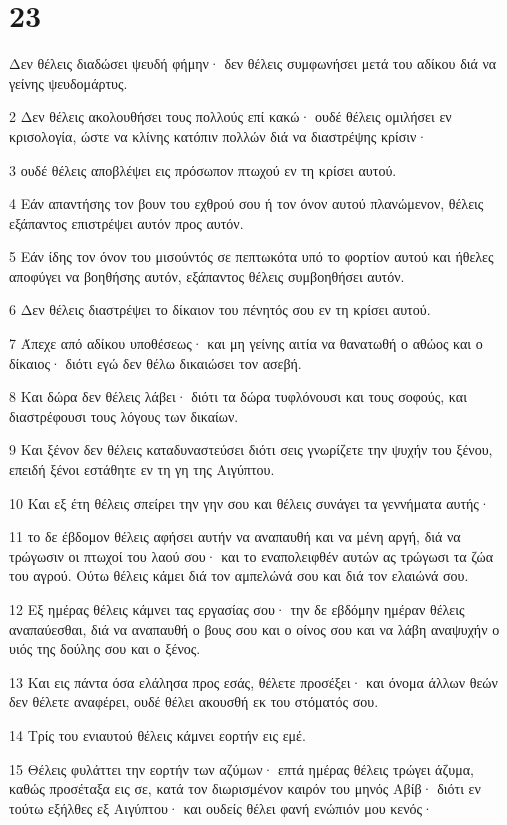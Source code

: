 \chapter{23}

\par Δεν θέλεις διαδώσει ψευδή φήμην· δεν θέλεις συμφωνήσει μετά του αδίκου διά να γείνης ψευδομάρτυς.
\par 2 Δεν θέλεις ακολουθήσει τους πολλούς επί κακώ· ουδέ θέλεις ομιλήσει εν κρισολογία, ώστε να κλίνης κατόπιν πολλών διά να διαστρέψης κρίσιν·
\par 3 ουδέ θέλεις αποβλέψει εις πρόσωπον πτωχού εν τη κρίσει αυτού.
\par 4 Εάν απαντήσης τον βουν του εχθρού σου ή τον όνον αυτού πλανώμενον, θέλεις εξάπαντος επιστρέψει αυτόν προς αυτόν.
\par 5 Εάν ίδης τον όνον του μισούντός σε πεπτωκότα υπό το φορτίον αυτού και ήθελες αποφύγει να βοηθήσης αυτόν, εξάπαντος θέλεις συμβοηθήσει αυτόν.
\par 6 Δεν θέλεις διαστρέψει το δίκαιον του πένητός σου εν τη κρίσει αυτού.
\par 7 Άπεχε από αδίκου υποθέσεως· και μη γείνης αιτία να θανατωθή ο αθώος και ο δίκαιος· διότι εγώ δεν θέλω δικαιώσει τον ασεβή.
\par 8 Και δώρα δεν θέλεις λάβει· διότι τα δώρα τυφλόνουσι και τους σοφούς, και διαστρέφουσι τους λόγους των δικαίων.
\par 9 Και ξένον δεν θέλεις καταδυναστεύσει διότι σεις γνωρίζετε την ψυχήν του ξένου, επειδή ξένοι εστάθητε εν τη γη της Αιγύπτου.
\par 10 Και εξ έτη θέλεις σπείρει την γην σου και θέλεις συνάγει τα γεννήματα αυτής·
\par 11 το δε έβδομον θέλεις αφήσει αυτήν να αναπαυθή και να μένη αργή, διά να τρώγωσιν οι πτωχοί του λαού σου· και το εναπολειφθέν αυτών ας τρώγωσι τα ζώα του αγρού. Ούτω θέλεις κάμει διά τον αμπελώνά σου και διά τον ελαιώνά σου.
\par 12 Εξ ημέρας θέλεις κάμνει τας εργασίας σου· την δε εβδόμην ημέραν θέλεις αναπαύεσθαι, διά να αναπαυθή ο βους σου και ο οίνος σου και να λάβη αναψυχήν ο υιός της δούλης σου και ο ξένος.
\par 13 Και εις πάντα όσα ελάλησα προς εσάς, θέλετε προσέξει· και όνομα άλλων θεών δεν θέλετε αναφέρει, ουδέ θέλει ακουσθή εκ του στόματός σου.
\par 14 Τρίς του ενιαυτού θέλεις κάμνει εορτήν εις εμέ.
\par 15 Θέλεις φυλάττει την εορτήν των αζύμων· επτά ημέρας θέλεις τρώγει άζυμα, καθώς προσέταξα εις σε, κατά τον διωρισμένον καιρόν του μηνός Αβίβ· διότι εν τούτω εξήλθες εξ Αιγύπτου· και ουδείς θέλει φανή ενώπιόν μου κενός·
